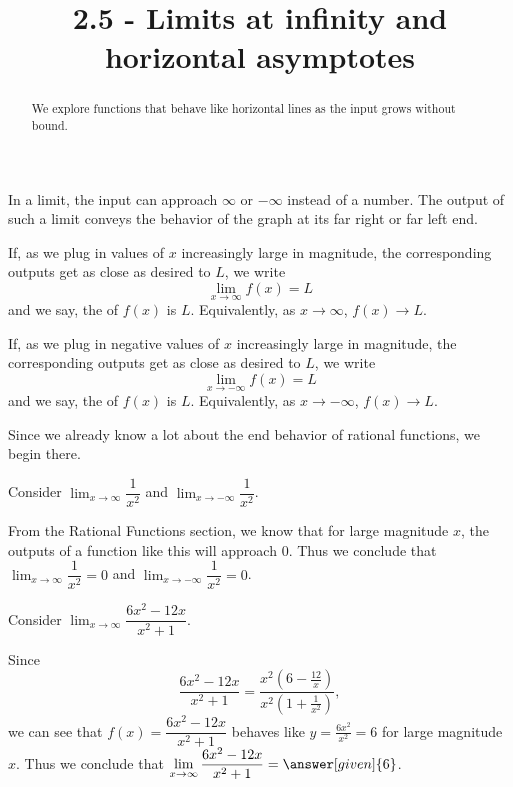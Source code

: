 \documentclass{ximera}
\title{2.5 - Limits at infinity and horizontal asymptotes}
\begin{document}
\begin{abstract}
We explore functions that behave like horizontal lines as the input
grows without bound.
\end{abstract}
\maketitle

In a limit, the input can approach $\infty$ or $-\infty$ instead of a number. The output of such a limit conveys the behavior of the graph at its far right or far left end.

\begin{definition}\label{def:limitAtInfty}
If, as we plug in values of $x$ increasingly large in magnitude, the corresponding outputs get as close as desired to $L$, we write
\[
\lim_{x\to \infty} f(x) = L
\]
and we say, the  of $f(x)$ is $L$. Equivalently, as $x\rightarrow\infty$, $f(x)\rightarrow L$.

If, as we plug in negative values of $x$ increasingly large in magnitude, the corresponding outputs get as close as desired to $L$, we write
\[
\lim_{x\to -\infty} f(x) = L
\]
and we say, the  of $f(x)$ is $L$. Equivalently, as $x\rightarrow -\infty$, $f(x)\rightarrow L$. 
\end{definition}

Since we already know a lot about the end behavior of rational functions, we begin there.

\begin{example}
	Consider $\displaystyle\lim_{x\rightarrow\infty}\dfrac{1}{x^2}$ and $\displaystyle\lim_{x\rightarrow -\infty}\dfrac{1}{x^2}$.
	\begin{explanation}
		From the Rational Functions section, we know that for large magnitude $x$, the outputs of a function like this will approach $0$. Thus we conclude that $\displaystyle\lim_{x\rightarrow\infty}\dfrac{1}{x^2}=0$ and $\displaystyle\lim_{x\rightarrow -\infty}\dfrac{1}{x^2}=0$.
	\end{explanation}
\end{example}

\begin{example}
	Consider $\displaystyle\lim_{x\rightarrow\infty}\dfrac{6x^2-12x}{x^2+1}$.
  \begin{explanation} Since $$\dfrac{6x^2-12x}{x^2+1}=\dfrac{x^2(6-\frac{12}{x})}{x^2(1+\frac{1}{x^2})},$$ we can see that $f(x)=\dfrac{6x^2-12x}{x^2+1}$ behaves like $y=\frac{6x^2}{x^2}=6$ for large magnitude $x$. Thus we conclude that $\displaystyle\lim_{x\rightarrow\infty}\dfrac{6x^2-12x}{x^2+1}=\answer[given]{6}$.
  \end{explanation}
\end{example}
\end{document}
